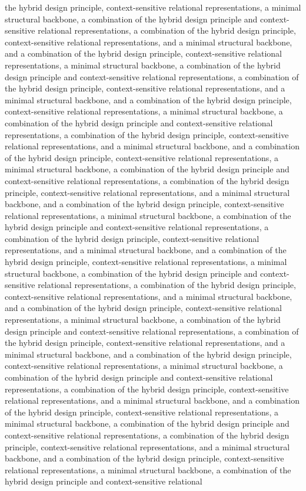 the hybrid design principle, context-sensitive relational representations, a minimal structural backbone, a combination of the hybrid design principle and context-sensitive relational representations, a combination of the hybrid design principle, context-sensitive relational representations, and a minimal structural backbone, and a combination of the hybrid design principle, context-sensitive relational representations, a minimal structural backbone, a combination of the hybrid design principle and context-sensitive relational representations, a combination of the hybrid design principle, context-sensitive relational representations, and a minimal structural backbone, and a combination of the hybrid design principle, context-sensitive relational representations, a minimal structural backbone, a combination of the hybrid design principle and context-sensitive relational representations, a combination of the hybrid design principle, context-sensitive relational representations, and a minimal structural backbone, and a combination of the hybrid design principle, context-sensitive relational representations, a minimal structural backbone, a combination of the hybrid design principle and context-sensitive relational representations, a combination of the hybrid design principle, context-sensitive relational representations, and a minimal structural backbone, and a combination of the hybrid design principle, context-sensitive relational representations, a minimal structural backbone, a combination of the hybrid design principle and context-sensitive relational representations, a combination of the hybrid design principle, context-sensitive relational representations, and a minimal structural backbone, and a combination of the hybrid design principle, context-sensitive relational representations, a minimal structural backbone, a combination of the hybrid design principle and context-sensitive relational representations, a combination of the hybrid design principle, context-sensitive relational representations, and a minimal structural backbone, and a combination of the hybrid design principle, context-sensitive relational representations, a minimal structural backbone, a combination of the hybrid design principle and context-sensitive relational representations, a combination of the hybrid design principle, context-sensitive relational representations, and a minimal structural backbone, and a combination of the hybrid design principle, context-sensitive relational representations, a minimal structural backbone, a combination of the hybrid design principle and context-sensitive relational representations, a combination of the hybrid design principle, context-sensitive relational representations, and a minimal structural backbone, and a combination of the hybrid design principle, context-sensitive relational representations, a minimal structural backbone, a combination of the hybrid design principle and context-sensitive relational representations, a combination of the hybrid design principle, context-sensitive relational representations, and a minimal structural backbone, and a combination of the hybrid design principle, context-sensitive relational representations, a minimal structural backbone, a combination of the hybrid design principle and context-sensitive relational 